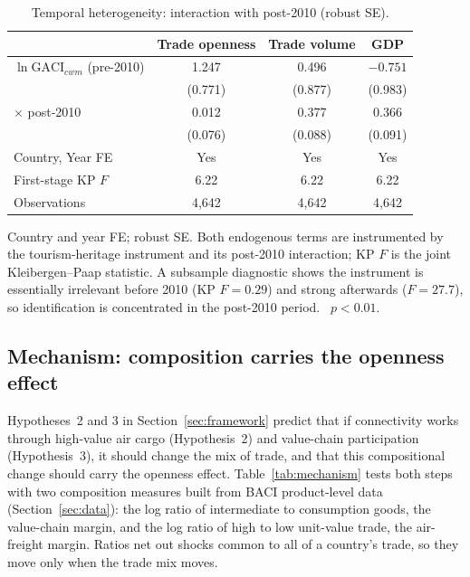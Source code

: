 \begin{table}[H]
\centering
\caption{Temporal heterogeneity: interaction with post-2010 (robust SE).}
\label{tab:temporal}
\begin{threeparttable}
\small
\begin{tabular}{lccc}
\toprule
 & Trade openness & Trade volume & GDP \\
\midrule
$\ln\mathrm{GACI}_{cwm}$ (pre-2010) & 1.247   & 0.496   & $-0.751$ \\
                        & (0.771) & (0.877) & (0.983) \\
$\times$ post-2010      & 0.012   & 0.377\sym{***} & 0.366\sym{***} \\
                        & (0.076) & (0.088) & (0.091) \\
\midrule
Country, Year FE        & Yes & Yes & Yes \\
First-stage KP $F$      & 6.22 & 6.22 & 6.22 \\
Observations            & 4{,}642 & 4{,}642 & 4{,}642 \\
\bottomrule
\end{tabular}
\begin{tablenotes}\footnotesize
\item Country and year FE; robust SE. Both endogenous terms are instrumented
by the tourism-heritage instrument and its post-2010 interaction; KP $F$ is
the joint Kleibergen--Paap statistic. A subsample diagnostic shows the
instrument is essentially irrelevant before 2010 (KP $F=0.29$) and strong
afterwards ($F=27.7$), so identification is concentrated in the post-2010
period.
\sym{***}~$p<0.01$.
\end{tablenotes}
\end{threeparttable}
\end{table}

\subsection{Mechanism: composition carries the openness effect}
\label{sec:mechanism}
\label{sec:mediation}
Hypotheses~2 and 3 in Section~\ref{sec:framework} predict that if
connectivity works through high-value air cargo (Hypothesis~2) and
value-chain participation (Hypothesis~3), it should change the mix of trade,
and that this compositional change should carry the openness effect.
Table~\ref{tab:mechanism} tests both steps with two composition measures
built from BACI product-level data (Section~\ref{sec:data}): the log
ratio of intermediate to consumption goods, the value-chain margin, and
the log ratio of high to low unit-value trade, the air-freight margin.
Ratios net out shocks common to all of a country's trade, so they move
only when the trade mix moves.

